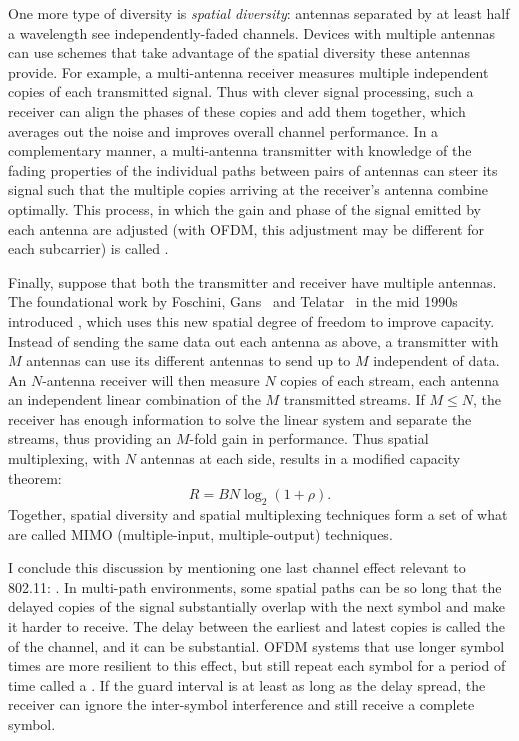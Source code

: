 One more type of diversity is \emph{spatial diversity}: antennas separated by at least half a wavelength see independently-faded channels. Devices with multiple antennas can use schemes that take advantage of the spatial diversity these antennas provide. For example, a multi-antenna receiver measures multiple independent copies of each transmitted signal. Thus with clever signal processing, such a receiver can align the phases of these copies and add them together, which averages out the noise and improves overall channel performance. In a complementary manner, a multi-antenna transmitter with knowledge of the fading properties of the individual paths between pairs of antennas can steer its signal such that the multiple copies arriving at the receiver's antenna combine optimally. This process, in which the gain and phase of the signal emitted by each antenna are adjusted (with OFDM, this adjustment may be different for each subcarrier) is called .

Finally, suppose that both the transmitter and receiver have multiple antennas. The foundational work by Foschini, Gans~\cite{Foschini_Gans} and Telatar~\cite{Telatar_MIMO} in the mid 1990s introduced , which uses this new spatial degree of freedom to improve capacity. Instead of sending the same data out each antenna as above, a transmitter with $M$ antennas can use its different antennas to send up to $M$ independent  of data. An $N$-antenna receiver will then measure $N$ copies of each stream, each antenna an independent linear combination of the $M$ transmitted streams. If $M \leq N$, the receiver has enough information to solve the linear system and separate the streams, thus providing an $M$-fold gain in performance. Thus spatial multiplexing, with $N$ antennas at each side, results in a modified capacity theorem:
\begin{equation}
\label{eq:mimo_capacity}
R = BN\log_2(1+\rho).
\end{equation}
Together, spatial diversity and spatial multiplexing techniques form a set of what are called MIMO (multiple-input, multiple-output) techniques.

I conclude this discussion by mentioning one last channel effect relevant to 802.11: . In multi-path environments, some spatial paths can be so long that the delayed copies of the signal substantially overlap with the next symbol and make it harder to receive. The delay between the earliest and latest copies is called the  of the channel, and it can be substantial. OFDM systems that use longer symbol times are more resilient to this effect, but still repeat each symbol for a period of time called a . If the guard interval is at least as long as the delay spread, the receiver can ignore the inter-symbol interference and still receive a complete symbol.

